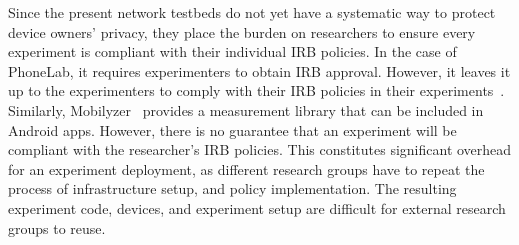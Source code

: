 Since the present network testbeds do not yet have a systematic 
way to protect device owners' privacy, they place 
the burden on researchers to ensure every 
experiment is compliant with their individual IRB policies.
In the case of PhoneLab, it requires experimenters to 
obtain IRB approval. However, it leaves it up to the experimenters 
to comply with their IRB policies in their 
experiments~\cite{nandugudi2013phonelab}. Similarly, 
Mobilyzer~\cite{nikravesh2015mobilyzer} provides a measurement
library that can be included in Android apps. 
However, there is no guarantee that an 
experiment will be compliant with the researcher's IRB policies.
This constitutes significant overhead for an experiment 
deployment, as different research groups have to repeat 
the process of infrastructure setup, and policy implementation. The resulting 
experiment code, devices, and experiment setup are 
difficult for external research groups to reuse.



